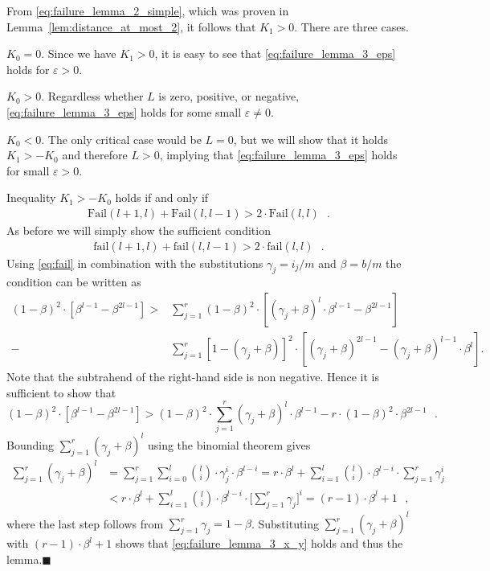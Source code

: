 \let\accentvec\vec \documentclass{llncs}
\newcommand{\proofEnd}{{\hfill\ensuremath{\blacksquare}}}
\newcommand{\cells}{\ensuremath{m}}
\newcommand{\eps}{\ensuremath{\varepsilon}}
\newcommand{\blank}{\text{ }}
\newcommand{\low}{\ensuremath{l}}
\newcommand{\Fail}{\mathrm{Fail}}
\newcommand{\fail}{\mathrm{fail}}
\newcommand{\bl}{\beta}
\newcommand{\hf}{\gamma}
\begin{document}
From \eqref{eq:failure_lemma_2_simple}, which was proven in Lemma~\ref{lem:distance_at_most_2}, it follows that $K_1>0$.
There are three cases.
\begin{compactitem}\item[$K_0=0$.] Since we have $K_1>0$, it is easy to see that \eqref{eq:failure_lemma_3_eps} holds for $\eps>0$.
 \item[$K_0>0$.] Regardless whether $L$ is zero, positive, or negative, \eqref{eq:failure_lemma_3_eps} holds for some small $\eps\neq0$.
 \item[$K_0<0$.] The only critical case would be $L=0$, but we will show that it holds $K_1>-K_0$ and therefore $L>0$, 
implying that \eqref{eq:failure_lemma_3_eps} holds for small $\eps>0$.
\end{compactitem}
\smallskip
Inequality $K_1>-K_0$ holds if and only if
\begin{align*}
 \Fail(\low+1,\low)+\Fail(\low,\low-1)>2\cdot \Fail(\low,\low) \blank.
\end{align*}
As before we will simply show the sufficient condition
\begin{align*}
 \fail(\low+1,\low)+\fail(\low,\low-1)>2\cdot \fail(\low,\low) \blank.
\end{align*}
Using \eqref{eq:fail} in combination with the substitutions
$\hf_j=i_j/\cells$  and $\bl=b/\cells$ the condition can be written as
\begin{align*}
(1-\bl)^2\cdot \left[ \bl^{\low-1}-\bl^{2\low-1} \right] >  &\sum_{j=1}^r (1-\bl)^2       \cdot \left[ (\hf_j+\bl)^\low\cdot \bl^{\low-1}-\bl^{2\low-1}\right] \\
                                                    - &\sum_{j=1}^r[1-(\hf_j+\bl)]^2 \cdot \left[ (\hf_j+\bl)^{2\low-1}           -(\hf_j+\bl)^{\low-1}\cdot \bl^\low\right] .
\end{align*}
Note that the subtrahend of the right-hand side is non negative. Hence
it is sufficient to show that
\begin{equation}
\label{eq:failure_lemma_3_x_y}
(1-\bl)^2\cdot \left[ \bl^{\low-1}-\bl^{2\low-1} \right] >    (1-\bl)^2 \cdot\sum_{j=1}^r  (\hf_j+\bl)^\low\cdot \bl^{\low-1} -r\cdot(1-\bl)^2\cdot \bl^{2\low-1} \blank.
\end{equation}
Bounding $\sum_{j=1}^r  (\hf_j+\bl)^\low$ using the binomial theorem gives
\begin{align*}
 \sum_{j=1}^r (\hf_j+\bl)^{\low} &= \sum_{j=1}^r \sum_{i=0}^\low \binom{\low}{i}\cdot \hf_j^i \cdot \bl^{\low-i} = r\cdot \bl^\low +  \sum_{i=1}^\low \binom{\low}{i} \cdot \bl^{\low-i}\cdot \sum_{j=1}^r \hf_j^i \\
&< r\cdot \bl^\low +  \sum_{i=1}^\low \binom{\low}{i}\cdot  \bl^{\low-i}\cdot \Bigg[ \sum_{j=1}^r \hf_j\Bigg]^i 
=(r-1)\cdot \bl^\low +1 \blank,
\end{align*}
where the last step follows from $\sum_{j=1}^r \hf_j=1-\bl$. Substituting $\sum_{j=1}^r (\hf_j+\bl)^{\low}$ with $(r-1)\cdot \bl^\low +1$ 
shows that \eqref{eq:failure_lemma_3_x_y} holds and thus the lemma.\proofEnd
\end{document}
